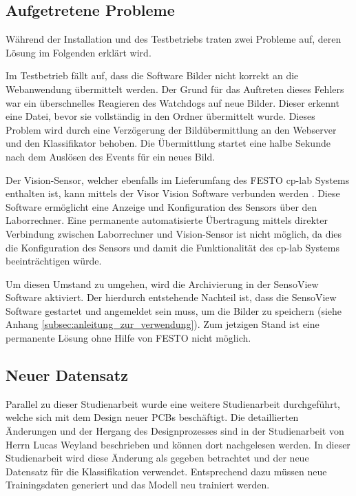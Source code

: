 \subsection{Aufgetretene Probleme} \label{subsec:aufgetretene_probleme}

Während der Installation und des Testbetriebs traten zwei Probleme auf, deren Lösung im Folgenden erklärt wird.

Im Testbetrieb fällt auf, dass die Software Bilder nicht korrekt an die Webanwendung übermittelt werden. Der Grund für das Auftreten dieses Fehlers war ein überschnelles Reagieren des Watchdogs auf neue Bilder. Dieser erkennt eine Datei, bevor sie vollständig in den Ordner übermittelt wurde. Dieses Problem wird durch eine Verzögerung der Bildübermittlung an den Webserver und den Klassifikator behoben. Die Übermittlung startet eine halbe Sekunde nach dem Auslösen des Events für ein neues Bild.

Der Vision-Sensor, welcher ebenfalls im Lieferumfang des FESTO \ac{cp-lab} Systems enthalten ist, kann mittels der Visor Vision Software verbunden werden \cite{sensopart_industriesensorik_gmbh_visor_2019}. Diese Software ermöglicht eine Anzeige und Konfiguration des Sensors über den Laborrechner. Eine permanente automatisierte Übertragung mittels direkter Verbindung zwischen Laborrechner und Vision-Sensor ist nicht möglich, da dies die Konfiguration des Sensors und damit die Funktionalität des \ac{cp-lab} Systems beeinträchtigen würde.

Um diesen Umstand zu umgehen, wird die Archivierung in der SensoView Software aktiviert. Der hierdurch entstehende Nachteil ist, dass die SensoView Software gestartet und angemeldet sein muss, um die Bilder zu speichern (siehe Anhang \autoref{subsec:anleitung_zur_verwendung}). Zum jetzigen Stand ist eine permanente Lösung ohne Hilfe von FESTO nicht möglich.

\subsection{Neuer Datensatz} \label{subsec:neuer_datzensatz}

Parallel zu dieser Studienarbeit wurde eine weitere Studienarbeit durchgeführt, welche sich mit dem Design neuer \ac{PCB}s beschäftigt. Die detaillierten Änderungen und der Hergang des Designprozesses sind in der Studienarbeit von Herrn Lucas Weyland beschrieben und können dort nachgelesen werden. In dieser Studienarbeit wird diese Änderung als gegeben betrachtet und der neue Datensatz für die Klassifikation verwendet. Entsprechend dazu müssen neue Trainingsdaten generiert und das Modell neu trainiert werden.

